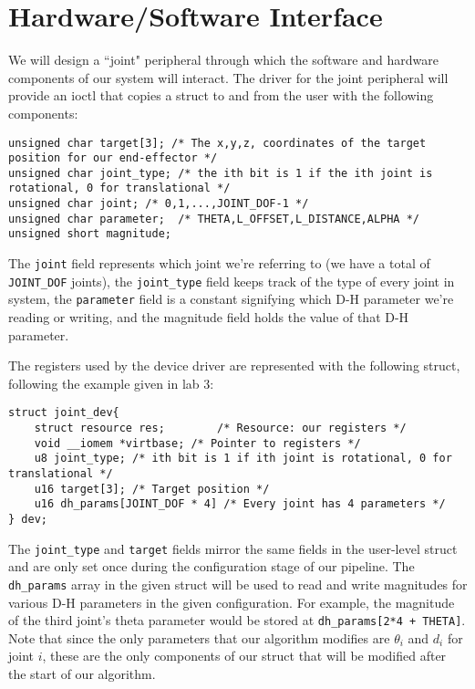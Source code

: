 \section{Hardware/Software Interface}

We will design a ``joint" peripheral through which the software and hardware components of our system will interact. 
The driver for the joint peripheral will provide an ioctl that copies a struct to and from the user with the following components:
\begin{verbatim}
unsigned char target[3]; /* The x,y,z, coordinates of the target position for our end-effector */
unsigned char joint_type; /* the ith bit is 1 if the ith joint is rotational, 0 for translational */
unsigned char joint; /* 0,1,...,JOINT_DOF-1 */
unsigned char parameter;  /* THETA,L_OFFSET,L_DISTANCE,ALPHA */ 
unsigned short magnitude; 
\end{verbatim}
The \texttt{joint} field represents which joint we're referring to (we have a total of \texttt{JOINT\_DOF} joints), the \texttt{joint\_type}
field keeps track of the type of every joint in system, the \texttt{parameter} field
is a constant signifying which D-H parameter we're reading or writing, and the magnitude field holds the value of that D-H parameter.

The registers used by the device driver are represented with the following struct, following the example given in lab 3:

\begin{verbatim}
struct joint_dev{
	struct resource res;		/* Resource: our registers */
	void __iomem *virtbase; /* Pointer to registers */
	u8 joint_type; /* ith bit is 1 if ith joint is rotational, 0 for translational */
	u16 target[3]; /* Target position */
	u16 dh_params[JOINT_DOF * 4] /* Every joint has 4 parameters */
} dev;
\end{verbatim}

The \texttt{joint\_type} and \texttt{target} fields mirror the same fields in the user-level struct and are only set once during the configuration
stage of our pipeline. The \texttt{dh\_params} array in the given struct will be used to read and write magnitudes for various D-H parameters in the 
given configuration. For example, the magnitude of the third joint's theta parameter would be stored at \texttt{dh\_params[2*4 + THETA]}. Note that
since the only parameters that our algorithm modifies are $\theta_i$ and $d_i$ for joint $i$, these are the only components of our struct that
will be modified after the start of our algorithm.

